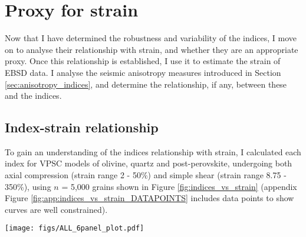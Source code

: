\documentclass[a4paper,12pt,twoside]{report}
\numberwithin{equation}{chapter}
\begin{document}
\section{Proxy for strain}

Now that I have determined the robustness and variability of the indices, I move on to analyse their relationship with strain, and whether they are an appropriate proxy. Once this relationship is established, I use it to estimate the strain of EBSD data. I analyse the seismic anisotropy measures introduced in Section \ref{sec:anisotropy_indices}, and determine the relationship, if any, between these and the indices.   

\subsection{Index-strain relationship}

To gain an understanding of the indices relationship with strain, I calculated each index for VPSC models of olivine, quartz and post-perovskite, undergoing both axial compression (strain range 2 - 50\%) and simple shear (strain range 8.75 - 350\%), using $n$ = 5,000 grains shown in Figure \ref{fig:indices_vs_strain} (appendix Figure \ref{fig:app:indices_vs_strain_DATAPOINTS} includes data points to show curves are well constrained).     

\begin{figure*}[p]
  \centering
    \texttt{[image: figs/ALL\_6panel\_plot.pdf]}
  \caption[Relation of indices to strain (VPSC)]{Relationship between the J-index, continuous M-index and discrete M-index to sample strain. Data are from VPSC models, with the indices calculated using the same 5,000 grains at each strain step (this many grains ensures the results are in the convergent regime). Discrete M-index calculated with a bin size of 0.25$^\circ$. \textbf{Top row} shows data for olivine, \textbf{middle row} shows quartz and \textbf{bottom row} shows post-perovskite (P-PS). \textbf{Left column} shows data from an axial compression VPSC model, the \textbf{right column} shows data from a simple shear VPSC model. Note the change of scale on both y-axes in \textbf{f}. Applying these scales to other plots reduces clarity --- consistent scales on all other plots (within each column) allows for useful comparison (see text).}
  \label{fig:indices_vs_strain}
\end{figure*} 
\end{document}
